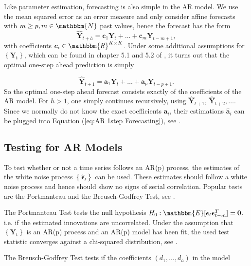 Like parameter estimation, forecasting is also simple in the AR model. We use the mean squared error as an error measure and only consider affine forecasts with $m\geq p,m \in \mathbbm{N}$ past values, hence the forecast has the form
\begin{equation}
\hat{\bm{Y}}_{t+h} = \bm{c}_1\bm{Y}_{t} + \ldots + \bm{c}_m\bm{Y}_{t-m+1},
\label{eq:Forecasting general}
\end{equation}
%
with coefficients $\bm{c}_i \in \mathbbm{R}^{K \times K}$. Under some additional assumptions for $\left\{\bm{Y}_t\right\}$, which can be found in chapter 5.1 and 5.2 of \textcite{Scherrer:2021}, it turns out that the optimal one-step ahead prediction is simply

\begin{equation}
\hat{\bm{Y}}_{t+1} = \bm{a}_1\bm{Y}_{t} + \ldots + \bm{a}_p\bm{Y}_{t-p+1}.
\label{eq:AR 1step Forecasting}
\end{equation}
%
So the optimal one-step ahead forecast consists exactly of the coefficients of the AR model. For $h>1$, one simply continues recursively, using $\hat{\bm{Y}}_{t+1}$, $\hat{\bm{Y}}_{t+2},\ldots$. Since we normally do not know the exact coefficients $\bm{a}_i$, their estimations $\hat{\bm{a}}_i$ can be plugged into Equation (\ref{eq:AR 1step Forecasting}), see \textcite{Scherrer:2021}. 

\subsection{Testing for AR Models}
\label{sec: Testing for ar models}

To test whether or not a time series follows an AR(p) process, the estimates of the white noise process $\left\{\hat{\bm{\epsilon}}_t\right\}$ can be used. These estimates should follow a white noise process and hence should show no signs of serial correlation. Popular tests are the Portmanteau and the Breusch-Godfrey Test, see \textcite{Lütkepohl:2007}. 

The Portmanteau Test tests the null hypothesis $H_0: \mathbbm{E}[\bm{\epsilon}_t \bm{\epsilon}_{t-m}^T]=\bm{0}$, i.e. if the estimated innovations are uncorrelated. Under the assumption that $\left\{\bm{Y}_t\right\}$ is an AR(p) process and an AR(p) model has been fit, the used test statistic converges against a chi-squared distribution, see \textcite{Lütkepohl:2007}. 

The Breusch-Godfrey Test tests if the coefficients $(d_1,\ldots,d_h)$ in the model 

